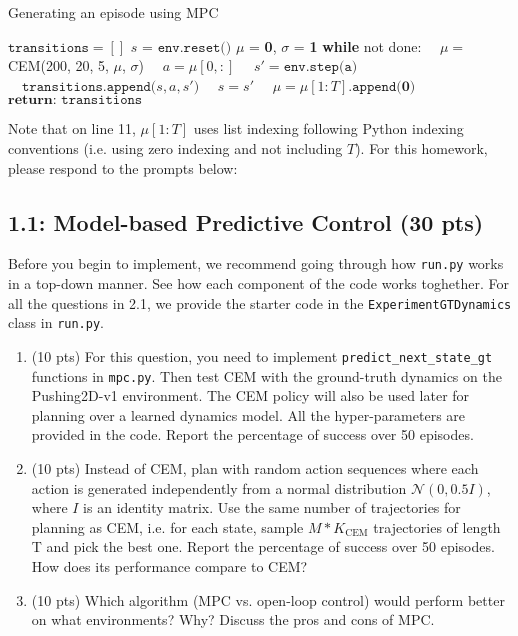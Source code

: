 \documentclass[12pt]{article}
\begin{document}
\begin{algorithm}
\label{alga2e}
\caption{Generating an episode using MPC\label{mpc}}
\begin{algorithmic}[1]
\State $\texttt{transitions} = []$
\State $s$ = $\texttt{env.reset()}$
\State $\mu$ = \textbf{0}, $\sigma$ = \textbf{1}
\State \textbf{while} not done:
\State $\quad \mu=$CEM(200, 20, 5, $\mu$, $\sigma$)
\State $\quad a=\mu[0,:]$
\State $\quad s' = \texttt{env.step(a)}$
\State $\quad \texttt{transitions.append(}s, a, s'\texttt{)}$
\State $\quad s = s'$
\State $\quad \mu=\mu[1:T]\texttt{.append(}\textbf{0}\texttt{)}$
\State $\textbf{return: } \texttt{transitions}$
\EndProcedure
\end{algorithmic}
\end{algorithm}
Note that on line 11, $\mu[1:T]$ uses list indexing following Python indexing conventions (i.e. using zero indexing and not including $T$).
For this homework, please respond to the prompts below:


\subsection*{1.1: Model-based Predictive Control (30 pts)}

Before you begin to implement, we recommend going through how \texttt{run.py} works in a top-down manner. See how each component of the code works toghether. For all the questions in 2.1, we provide the starter code in the \texttt{ExperimentGTDynamics} class in \texttt{run.py}.
 
\begin{enumerate}
    \item (10 pts) For this question, you need to implement \texttt{predict\_next\_state\_gt} functions in \texttt{mpc.py}. Then test CEM with the ground-truth dynamics on the Pushing2D-v1 environment. The CEM policy will also be used later for planning over a learned dynamics model. All the hyper-parameters are provided in the code. Report the percentage of success over 50 episodes.
    
    \item (10 pts) Instead of CEM, plan with random action sequences where each action is generated independently from a normal distribution $\mathcal N(0, 0.5I)$, where $I$ is an identity matrix. Use the same number of trajectories for planning as CEM, i.e. for each state, sample $M*K_{\text{CEM}}$ trajectories of length T and pick the best one. Report the percentage of success over 50 episodes. How does its performance compare to CEM?
    
    \item (10 pts) Which algorithm (MPC vs. open-loop control) would perform better on what environments? Why? Discuss the pros and cons of MPC.
\end{enumerate}
\end{document}
